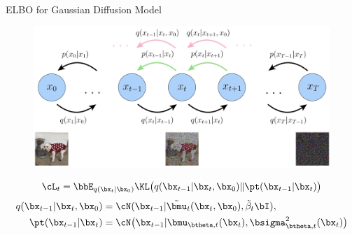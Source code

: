 \documentclass{beamer}
\begin{document}
\begin{frame}{ELBO for Gaussian Diffusion Model}
    \begin{figure}
        \includegraphics[width=\linewidth]{figs/diffusion_objective}
    \end{figure}
    \[
        \cL_t = \bbE_{q(\bx_t | \bx_0)} \KL \bigl(q(\bx_{t-1} | \bx_t, \bx_0) \| \pt(\bx_{t-1} | \bx_t)\bigr)
    \]
    \begin{align*}
        q(\bx_{t-1} | \bx_t, \bx_0) &= \cN(\bx_{t-1} | \tilde{\bmu}_t(\bx_t, \bx_0), \tilde{\beta}_t \bI), \\
        \pt(\bx_{t - 1} | \bx_t) &= \cN \bigl(\bx_{t - 1} | \bmu_{\btheta, t}(\bx_t), \bsigma_{\btheta, t}^2(\bx_t)\bigr)
    \end{align*}
\end{frame}
\end{document}

